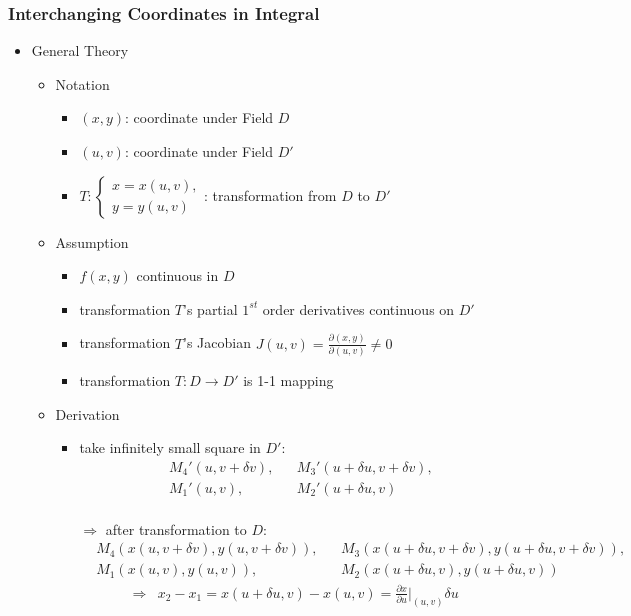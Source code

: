 \subsubsection{Interchanging Coordinates in Integral}
\begin{itemize}
\item General Theory
	\begin{itemize}
	\item Notation
		\begin{itemize}
		\item $(x,y)$: coordinate under Field $D$
		\item $(u,v)$: coordinate under Field $D'$
		\item $\displaystyle T: \begin{cases} x=x(u,v), \\ y=y(u,v) \end{cases}$: transformation from $D$ to $D'$
		\end{itemize} 
	\item Assumption
		\begin{itemize}
		\item $f(x,y)$ continuous in $D$
		\item transformation $T$'s partial $1^{st}$ order derivatives continuous on $D'$
		\item transformation $T$'s Jacobian $J(u,v) = \frac {\partial (x,y)}{\partial (u,v)} \neq 0$
		\item transformation $T: D\rightarrow D'$ is 1-1 mapping
		\end{itemize}
	\item Derivation
		\begin{itemize}
		\item take infinitely small square in $D':$
		\begin{align*} &M_4'(u,v+\delta v),&&M_3'(u+\delta u, v+\delta v),\\&M_1'(u, v),&&M_2'(u+\delta u, v) \end{align*} \\
		$\Rightarrow$ after transformation to $D:$ 
		\begin{align*} 
		&M_4(x(u,v+\delta v),y(u,v+\delta v)),&&M_3(x(u+\delta u, v+\delta v),y(u+\delta u, v+\delta v)),\\&M_1(x(u, v),y(u, v)),&&M_2(x(u+\delta u, v),y(u+\delta u, v)) 
		\end{align*}
		\begin{align*} 
		\Rightarrow &x_2 - x_1 = x(u+\delta u, v) - x(u,v) = \frac {\partial x}{\partial u}\rvert_{(u,v)} \delta u \\

\end{align*}
\end{itemize}
\end{itemize}
\end{itemize}

